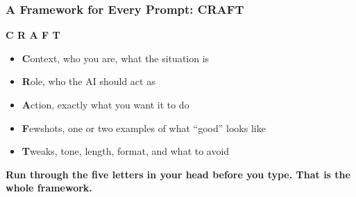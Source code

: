 \begin{frame}[fragile]\frametitle{A Framework for Every Prompt: CRAFT}

\begin{center}
\Large \textbf{C R A F T}
\end{center}

\medskip
\begin{itemize}
    \item \textbf{C}ontext, who you are, what the situation is
    \item \textbf{R}ole, who the AI should act as
    \item \textbf{A}ction, exactly what you want it to do
    \item \textbf{F}ewshots, one or two examples of what ``good'' looks like
    \item \textbf{T}weaks, tone, length, format, and what to avoid
\end{itemize}

\medskip
\begin{center}
\textbf{Run through the five letters in your head before you type. That is the whole framework.}
\end{center}

\end{frame}

%
%
%
%


